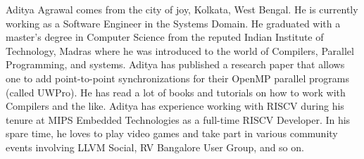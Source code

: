 Aditya Agrawal comes from the city of joy, Kolkata, West Bengal. He is currently working as a Software Engineer in the Systems Domain. He graduated with a master's degree in Computer Science from the reputed Indian Institute of Technology, Madras where he was introduced to the world of Compilers, Parallel Programming, and systems. Aditya has published a research paper that allows one to add point-to-point synchronizations for their OpenMP parallel programs (called UWPro). He has read a lot of books and tutorials on how to work with Compilers and the like. Aditya has experience working with RISCV during his tenure at MIPS Embedded Technologies as a full-time RISCV Developer. In his spare time, he loves to play video games and take part in various community events involving LLVM Social, RV Bangalore User Group, and so on.

